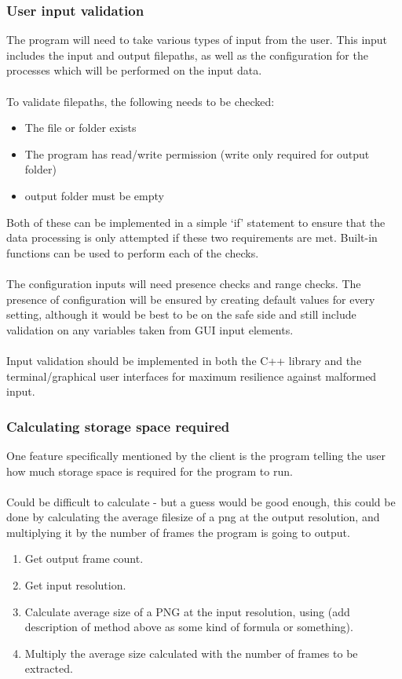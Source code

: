 \documentclass[11pt]{report}
\begin{document}
\subsubsection{User input validation}
The program will need to take various types of input from the user. This input includes the input and output filepaths, as well as the configuration for the processes which will be performed on the input data.\\\\
To validate filepaths, the following needs to be checked:
\begin{itemize}
\item The file or folder exists
\item The program has read/write permission (write only required for output folder)
\item output folder must be empty
\end{itemize}
Both of these can be implemented in a simple `if' statement to ensure that the data processing is only attempted if these two requirements are met. Built-in functions can be used to perform each of the checks.\\\\
The configuration inputs will need presence checks and range checks.
The presence of configuration will be ensured by creating default values for every setting, although it would be best to be on the safe side and still include validation on any variables taken from GUI input elements.\\\\
Input validation should be implemented in both the C++ library and the terminal/graphical user interfaces for maximum resilience against malformed input.
\subsubsection{Calculating storage space required}
One feature specifically mentioned by the client is the program telling the user how much storage space is required for the program to run.\\\\
Could be difficult to calculate - but a guess would be good enough, this could be done by calculating the average filesize of a png at the output resolution, and multiplying it by the number of frames the program is going to output.
\begin{enumerate}
\item Get output frame count.
\item Get input resolution.
\item Calculate average size of a PNG at the input resolution, using (add description of method above as some kind of formula or something).
\item Multiply the average size calculated with the number of frames to be extracted.
\end{enumerate}
\end{document}
